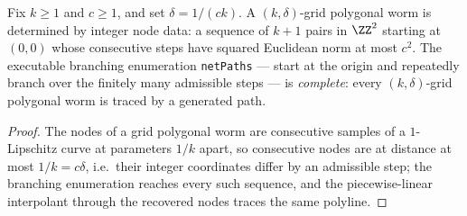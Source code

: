 \begin{theorem}
    \label{thm:netEnumeration}
    \leanok
    Fix $k \ge 1$ and $c \ge 1$, and set $\delta = 1/(ck)$. A $(k,\delta)$-grid
    polygonal worm is determined by integer node data: a sequence of $k+1$
    pairs in $\ZZ^2$ starting at $(0,0)$ whose consecutive steps have squared
    Euclidean norm at most $c^2$. The executable branching enumeration
    \texttt{netPaths} — start at the origin and repeatedly branch over the
    finitely many admissible steps — is \emph{complete}: every
    $(k,\delta)$-grid polygonal worm is traced by a generated path.
\end{theorem}
\begin{proof}
    The nodes of a grid polygonal worm are consecutive samples of a
    $1$-Lipschitz curve at parameters $1/k$ apart, so consecutive nodes are at
    distance at most $1/k = c\delta$, i.e.\ their integer coordinates differ
    by an admissible step; the branching enumeration reaches every such
    sequence, and the piecewise-linear interpolant through the recovered nodes
    traces the same polyline.
\end{proof}

